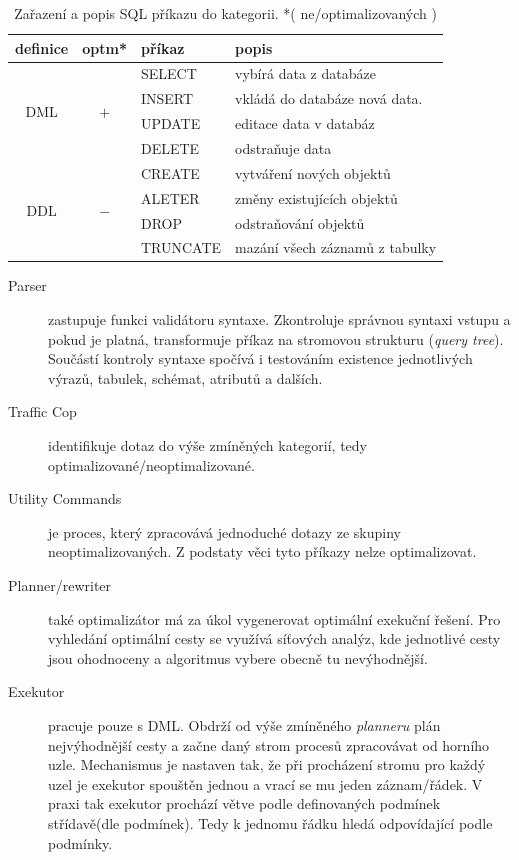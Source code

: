 \documentclass[a4paper,12pt]{report}
\begin{document}
\begin{table}[h]
   \centering
\begin{tabular}{|ccll|}
\hline
definice & optm* & příkaz & popis \\ \hline \hline
\multirow{4}{*}{DML} & \multirow{4}{*}{$+$} & SELECT & vybírá data z databáze \\
 &  & INSERT & vkládá do databáze nová data. \\
 &  & UPDATE & editace data v databáz \\
 &  & DELETE & odstraňuje data \\ \hline
\multirow{4}{*}{DDL} & \multirow{4}{*}{$-$} & CREATE & vytváření nových objektů \\
 &  & ALETER & změny existujících objektů \\
 &  & DROP & odstraňování objektů \\
 &  & TRUNCATE & mazání všech záznamů z tabulky \\ \hline
\end{tabular}

\caption{Zařazení a popis SQL příkazu do kategorii.
*( ne/optimalizovaných )}
\label{tab:prikazy}
\end{table}


\begin{description}
\item[Parser]zastupuje funkci validátoru syntaxe. Zkontroluje správnou syntaxi vstupu a pokud je platná, transformuje příkaz na stromovou strukturu (\textit{query tree}). Součástí kontroly syntaxe spočívá i testováním existence jednotlivých výrazů, tabulek, schémat, atributů a dalších.

\item[Traffic Cop] identifikuje dotaz do výše zmíněných kategorií, tedy optimalizované\-/neoptimalizované.

\item[Utility Commands] je proces, který zpracovává jednoduché dotazy ze skupiny neoptimalizovaných. Z podstaty věci tyto příkazy nelze  optimalizovat.

\item[Planner/rewriter] také optimalizátor má za úkol vygenerovat optimální exekuční řešení. Pro vyhledání optimální cesty se využívá síťových analýz, kde jednotlivé cesty jsou  ohodnoceny a algoritmus vybere obecně tu nevýhodnější.

\item[Exekutor] pracuje pouze s \acs{DML}. Obdrží od výše zmíněného \textit{planneru} plán nejvýhodnější cesty a začne daný strom procesů zpracovávat od horního uzle. Mechanismus je  nastaven tak, že při procházení stromu pro každý uzel je exekutor spouštěn jednou a vrací se mu jeden záznam/řádek. V praxi tak exekutor prochází větve podle definovaných podmínek střídavě(dle podmínek). Tedy k jednomu řádku hledá odpovídající podle podmínky. 
\end{description}
\end{document}
